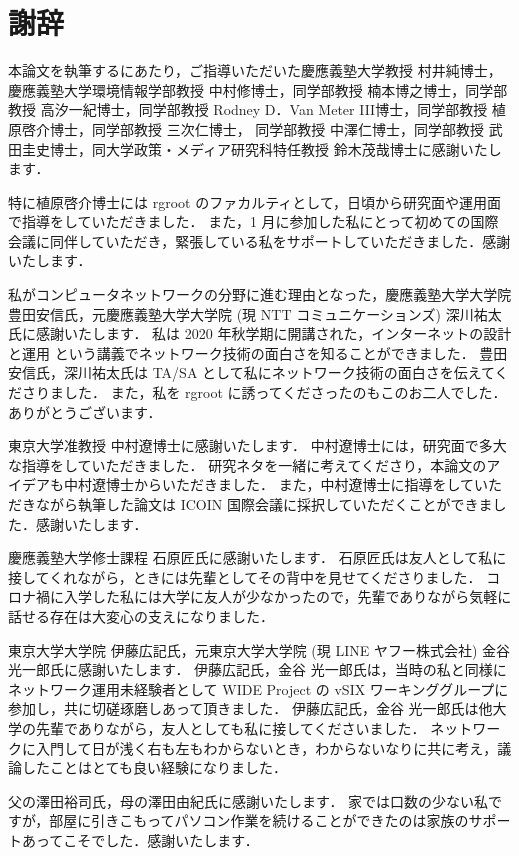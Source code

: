 \chapter*{謝辞}
\label{thanks}
本論文を執筆するにあたり，ご指導いただいた慶應義塾大学教授 村井純博士，慶應義塾大学環境情報学部教授 中村修博士，同学部教授 楠本博之博士，同学部教授 高汐一紀博士，同学部教授 Rodney D．Van Meter III博士，同学部教授 植原啓介博士，同学部教授 三次仁博士，
同学部教授 中澤仁博士，同学部教授 武田圭史博士，同大学政策・メディア研究科特任教授 鈴木茂哉博士に感謝いたします．

特に植原啓介博士には rgroot のファカルティとして，日頃から研究面や運用面で指導をしていただきました．
また，1 月に参加した私にとって初めての国際会議に同伴していただき，緊張している私をサポートしていただきました．感謝いたします．

私がコンピュータネットワークの分野に進む理由となった，慶應義塾大学大学院 豊田安信氏，元慶應義塾大学大学院 (現 NTT コミュニケーションズ) 深川祐太氏に感謝いたします．
私は 2020 年秋学期に開講された，インターネットの設計と運用 という講義でネットワーク技術の面白さを知ることができました．
豊田安信氏，深川祐太氏は TA/SA として私にネットワーク技術の面白さを伝えてくださりました．
また，私を rgroot に誘ってくださったのもこのお二人でした．
ありがとうございます．

東京大学准教授 中村遼博士に感謝いたします．
中村遼博士には，研究面で多大な指導をしていただきました．
研究ネタを一緒に考えてくださり，本論文のアイデアも中村遼博士からいただきました．
また，中村遼博士に指導をしていただきながら執筆した論文は ICOIN 国際会議に採択していただくことができました．感謝いたします．

慶應義塾大学修士課程 石原匠氏に感謝いたします．
石原匠氏は友人として私に接してくれながら，ときには先輩としてその背中を見せてくださりました．
コロナ禍に入学した私には大学に友人が少なかったので，先輩でありながら気軽に話せる存在は大変心の支えになりました．

東京大学大学院 伊藤広記氏，元東京大学大学院 (現 LINE ヤフー株式会社) 金谷 光一郎氏に感謝いたします．
伊藤広記氏，金谷 光一郎氏は，当時の私と同様にネットワーク運用未経験者として WIDE Project の vSIX ワーキンググループに参加し，共に切磋琢磨しあって頂きました．
伊藤広記氏，金谷 光一郎氏は他大学の先輩でありながら，友人としても私に接してくださいました．
ネットワークに入門して日が浅く右も左もわからないとき，わからないなりに共に考え，議論したことはとても良い経験になりました．

父の澤田裕司氏，母の澤田由紀氏に感謝いたします．
家では口数の少ない私ですが，部屋に引きこもってパソコン作業を続けることができたのは家族のサポートあってこそでした．感謝いたします．

